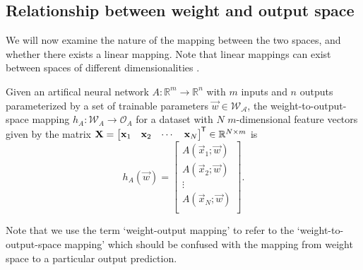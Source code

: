 \subsection{Relationship between weight and output space}
We will now examine the nature of the mapping between the two spaces, and whether there exists a linear mapping. 
Note that linear mappings can exist between spaces of different dimensionalities \cite{rudin2006}.

\begin{definition}
    \label{def:weight_output_space_mapping}
    Given an artifical neural network $A:\mathbb{R}^m \rightarrow \mathbb{R}^n$ with $m$ inputs and $n$ outputs parameterized by a set of trainable parameters $\vec{w} \in \mathcal{W_A}$,
    the weight-to-output-space mapping $h_A: \mathcal{W}_A \rightarrow \mathcal{O}_A$ for a dataset with $N$ $m$-dimensional feature vectors given by the matrix
    $\mathbf{X} = \begin{bmatrix}
        \mathbf{x}_1 & \mathbf{x}_2 & \cdots & \mathbf{x}_N
    \end{bmatrix}^{\mkern-1.5mu\mathsf{T}} \in \mathbb{R}^{N\times m}$
    is
    \begin{equation*}
        h_A \left( \vec{w} \right)
        = \begin{bmatrix}
            A(\vec{x}_1; \vec{w} ) \\
            A(\vec{x}_2; \vec{w} ) \\
            \vdots \\
            A(\vec{x}_N; \vec{w} ) \\
        \end{bmatrix}.
    \end{equation*}

    Note that we use the term `weight-output mapping' to refer to the `weight-to-output-space mapping' which should be confused with the mapping from weight space to a particular output prediction. 
\end{definition}

